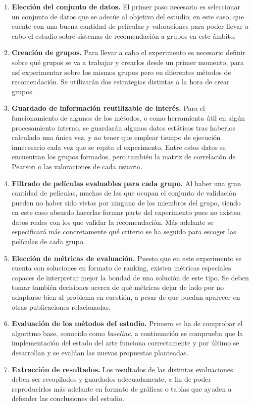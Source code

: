 \begin{enumerate}
	\item \textbf{Elección del conjunto de datos.} El primer paso necesario es seleccionar un conjunto de datos que se adecúe al objetivo del estudio; en este caso, que cuente con una buena cantidad de películas y valoraciones para poder llevar a cabo el estudio sobre sistemas de recomendación a grupos en este ámbito.
	\item \textbf{Creación de grupos.} Para llevar a cabo el experimento es necesario definir sobre qué grupos se va a trabajar y crearlos desde un primer momento, para así experimentar sobre los mismos grupos pero en diferentes métodos de recomendación. Se utilizarán dos estrategias distintas a la hora de crear grupos.
	\item \textbf{Guardado de información reutilizable de interés.} Para el funcionamiento de algunos de los métodos, o como herramienta útil en algún procesamiento interno, se guardarán algunos datos estáticos tras haberlos calculado una única vez, y no tener que emplear tiempo de ejecución innecesario cada vez que se repita el experimento. Entre estos datos se encuentran los grupos formados, pero también la matriz de correlación de Pearson o las valoraciones de cada usuario.
	\item \textbf{Filtrado de películas evaluables para cada grupo.} Al haber una gran cantidad de películas, muchas de las que ocupan el conjunto de validación pueden no haber sido vistas por ninguno de los miembros del grupo, siendo en este caso absurdo hacerlas formar parte del experimento pues no existen datos reales con los que validar la recomendación. Más adelante se especificará más concretamente qué criterio se ha seguido para escoger las películas de cada grupo.
	\item \textbf{Elección de métricas de evaluación.} Puesto que en este experimento se cuenta con soluciones en formato de ranking, existen métricas especiales capaces de interpretar mejor la bondad de una solución de este tipo. Se deben tomar también decisiones acerca de qué métricas dejar de lado por no adaptarse bien al problema en cuestión, a pesar de que puedan aparecer en otras publicaciones relacionadas.
	\item \textbf{Evaluación de los métodos del estudio.} Primero se ha de comprobar el algoritmo base, conocido como \textit{baseline}, a continuación se comprueba que la implementación del estado del arte funciona correctamente y por último se desarrollan y se evalúan las nuevas propuestas planteadas.
	\item \textbf{Extracción de resultados.} Los resultados de las distintas evaluaciones deben ser recopilados y guardados adecuadamente, a fin de poder reproducirlos más adelante en formato de gráficas o tablas que ayuden a defender las conclusiones del estudio.
\end{enumerate}


